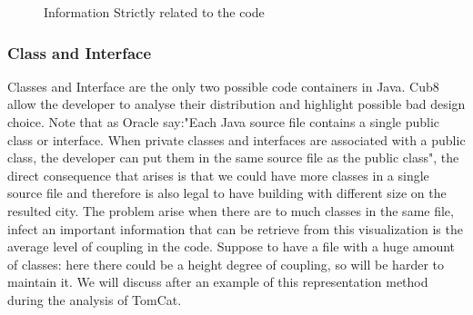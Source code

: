\documentclass[]{usiinfbachelorproject}
\begin{document}
\begin{figure}[h]
\centering
{}
\hspace*{\fill}

\caption{Information Strictly related to the code}
\label{fig:strictly}
\end{figure}
\newpage

\subsubsection{Class and Interface}

Classes and Interface are the only two possible code containers in Java. Cub8 allow the developer to analyse their distribution and highlight possible bad design choice.
Note that as Oracle \cite{oracle} say:"Each Java source file contains a single public class or interface. When private classes and interfaces are associated with a public class, the developer can put them in the same source file as the public class", the direct consequence that arises is that we could have more classes in a single source file and therefore is also legal to have building with different size on the resulted city.
The problem arise when there are to much classes in the same file, infect an important information that can be retrieve from this visualization is the average level of coupling in the code. Suppose to have a file with a huge amount of classes: here there could be a  height degree of coupling, so will be harder to maintain it. We will discuss after an example of this representation method during the analysis of TomCat.
\end{document}
